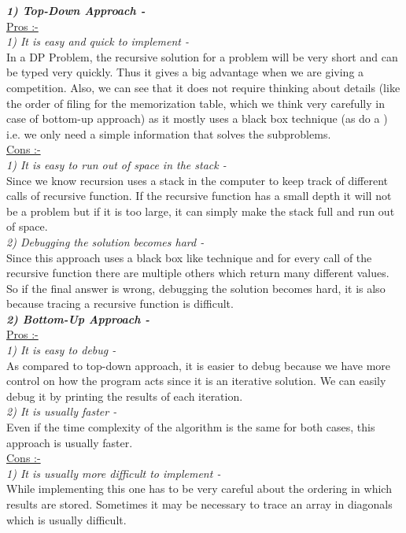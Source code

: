\documentclass[12pt]{book}
\begin{document}
	\textbf{\textit{1)  Top-Down Approach -}}\\
\underline{Pros :-}\\
	 \textit{1) It is easy and quick to implement -}\\In a DP Problem, the recursive solution for a problem will be very short and can be typed very quickly. Thus it gives a big advantage when we are giving a competition. Also, we can see that it does not require thinking about details (like the order of filing for the memorization table, which we think very carefully in case of bottom-up approach) as it mostly uses a black box technique (as do a ) i.e. we only need a simple information that solves the subproblems.\\

\underline{Cons :-}\\
\textit{1) It is easy to run out of space in the stack -}\\Since we know recursion uses a stack in the computer to keep track of different calls of recursive function. If the recursive function has a small depth it will not be a problem but if it is too large, it can simply make the stack full and run out of space.\\

\textit{2) Debugging the solution becomes hard -}\\Since this approach uses a black box like technique and for every call of the recursive function there are multiple others which return many different values. So if the final answer is wrong, debugging the solution becomes hard, it is also because tracing a recursive function is difficult.\\

	\textbf{\textit{2)  Bottom-Up Approach -}}\\
\underline{Pros :-}\\
\textit{1) It is easy to debug -}\\As compared to top-down approach, it is easier to debug because we have more control on how the program acts since it is an iterative solution. We can easily debug it by printing the results of each iteration.\\

\textit{2) It is usually faster -}\\Even if the time complexity of the algorithm is the same for both cases, this approach is usually faster.\\

\underline{Cons :-}\\
\textit{1) It is usually more difficult to implement -}\\While implementing this one has to be very careful about the ordering in which results are stored. Sometimes it may be necessary to trace an array in diagonals which is usually difficult.\\
\end{document}

